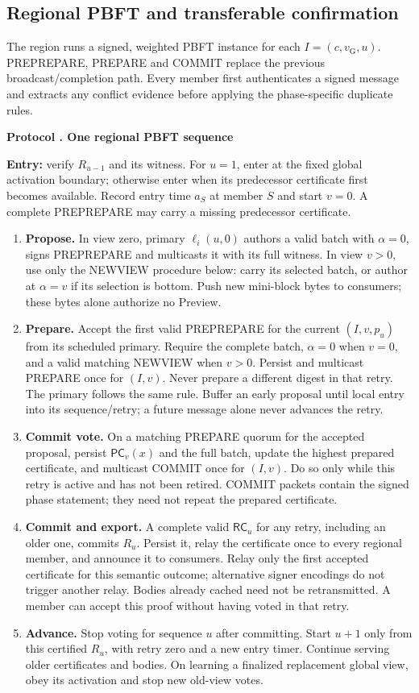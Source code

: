 \documentclass[11pt,a4paper,onecolumn]{article}
\newcommand{\RC}{\mathsf{RC}}
\newcommand{\gv}{v_{\mathrm G}}
\newcommand{\PC}{\mathsf{PC}}
\theoremstyle{remark}\newtheorem{example}[definition]{Example}
\newcounter{protocol}
\newenvironment{protocol}[2]{\refstepcounter{protocol}\label{#1}\begin{mdframed}[nobreak=true,linewidth=.6pt,skipabove=10pt,skipbelow=10pt,innertopmargin=8pt,innerbottommargin=8pt]\small\raggedright\noindent\textbf{Protocol \theprotocol. #2}\par\smallskip}{\end{mdframed}}
\begin{document}
\subsection{Regional PBFT and transferable confirmation}\label{sec:regional}
The region runs a signed, weighted PBFT instance for each $I=(c,\gv,u)$.
PREPREPARE, PREPARE and COMMIT replace the previous broadcast/completion path.
Every member first authenticates a signed message and extracts any conflict
evidence before applying the phase-specific duplicate rules.

\begin{protocol}{alg:regional}{One regional PBFT sequence}
\textbf{Entry:} verify $R_{u-1}$ and its witness. For $u=1$, enter at the fixed
global activation boundary; otherwise enter when its predecessor certificate
first becomes available. Record entry time $a_S$ at member $S$ and start $v=0$.
A complete PREPREPARE may carry a missing predecessor certificate.
\begin{enumerate}[label=\textbf{R\arabic*.}]
\item \textbf{Propose.} In view zero, primary $\ell_i(u,0)$ authors a valid
batch with $\alpha=0$, signs PREPREPARE and multicasts it with its full witness.
In view $v>0$, use only the NEWVIEW procedure below: carry its selected batch,
or author at $\alpha=v$ if its selection is bottom. Push new mini-block bytes
to consumers; these bytes alone authorize no Preview.
\item \textbf{Prepare.} Accept the first valid PREPREPARE for the current
$(I,v,p_u)$ from its scheduled primary. Require the complete batch, $\alpha=0$
when $v=0$, and a valid matching NEWVIEW when $v>0$. Persist and multicast
PREPARE once for $(I,v)$. Never prepare a different digest in that retry.
The primary follows the same rule. Buffer an early proposal until local entry
into its sequence/retry; a future message alone never advances the retry.
\item \textbf{Commit vote.} On a matching PREPARE quorum for the accepted
proposal, persist $\PC_v(x)$ and the full batch, update the highest prepared
certificate, and multicast COMMIT once for $(I,v)$. Do so only while this
retry is active and has not been retired. COMMIT packets contain the signed
phase statement; they need not repeat the prepared certificate.
\item \textbf{Commit and export.} A complete valid $\RC_u$ for any retry,
including an older one, commits $R_u$. Persist it, relay the certificate once
to every regional member, and announce it to consumers. Relay only the first
accepted certificate for this semantic outcome; alternative signer encodings
do not trigger another relay. Bodies already cached need not be retransmitted.
A member can accept this proof without having voted in that retry.
\item \textbf{Advance.} Stop voting for sequence $u$ after committing. Start
$u+1$ only from this certified $R_u$, with retry zero and a new entry timer.
Continue serving older certificates and bodies. On learning a finalized
replacement global view, obey its activation and stop new old-view votes.
\end{enumerate}
\end{protocol}
\end{document}
